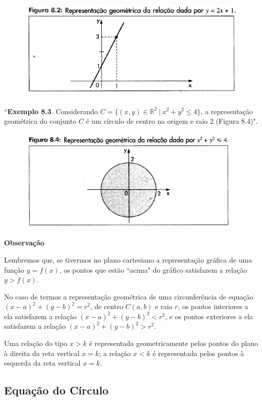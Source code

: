 		\begin{figure}[H]
			\includegraphics[height=5cm]{images/morettin_figura-8-2}
		\end{figure}

		``\textbf{Exemplo 8.3}. Considerando $C = \{(x, y) \in \mathbb{R}^{2} \ | \ x^{2} + y^{2} \leq 4\}$, a representação geométrica do conjunto $C$ é um círculo de centro na origem e raio $2$ (Figura 8.4)".

		\begin{figure}[H]
			\includegraphics[height=5cm]{images/morettin_figura-8-4}
		\end{figure}

		\textbf{Observação}

		Lembremos que, se tivermos no plano cartesiano a representação gráfica de uma função $y = f(x)$, os pontos que estão ``acima" do gráfico satisfazem a relação $y > f(x)$.

		No caso de termos a representação geométrica de uma circunferência de equação $(x - a)^{2} + (y - b)^{2} = r^{2}$, de centro $C(a, b)$ e raio $r$, os pontos interiores a ela satisfazem a relação $(x - a)^{2} + (y - b)^{2} < r^{2}$, e os pontos exteriores a ela satisfazem a relação $(x - a)^{2} + (y - b)^{2} > r^{2}$.

		Uma relação do tipo $x  > k$ é representada geometricamente pelos pontos do plano à direita da reta vertical $x = k$; a relação $x < k$ é representada pelos pontos à esquerda da reta vertical $x = k$.

	\subsection{Equação do Círculo \cite{wikipedia}}

